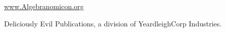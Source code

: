 %

\href{http://www.algebranomicon.org}{www.Algebranomicon.org}

Deliciously Evil Publications, a division of YeardleighCorp Industries.

\clearpage
